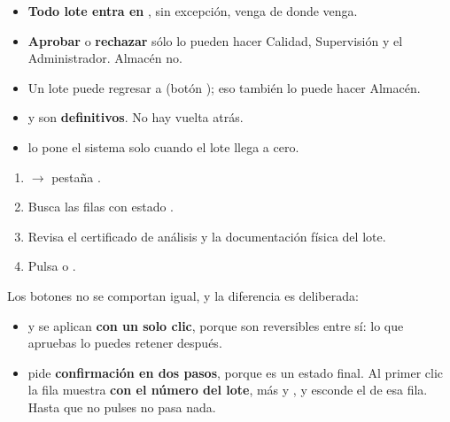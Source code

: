 \begin{itemize}
    \item \textbf{Todo lote entra en \cuarentena}, sin excepción, venga de donde venga.
    \item \textbf{Aprobar} o \textbf{rechazar} sólo lo pueden hacer Calidad, Supervisión
          y el Administrador. Almacén no.
    \item Un lote \aprobado{} puede regresar a \cuarentena{} (botón );
          eso también lo puede hacer Almacén.
    \item \rechazado{} y \agotado{} son \textbf{definitivos}. No hay vuelta atrás.
    \item \agotado{} lo pone el sistema solo cuando el lote llega a cero.
\end{itemize}


\begin{enumerate}
    \item {} $\rightarrow$ pestaña .
    \item Busca las filas con estado \cuarentena.
    \item Revisa el certificado de análisis y la documentación física del lote.
    \item Pulsa  o .
\end{enumerate}


\vspace{6pt}

Los botones no se comportan igual, y la diferencia es deliberada:

\begin{itemize}
    \item {} y  se aplican \textbf{con un solo clic}, porque
          son reversibles entre sí: lo que apruebas lo puedes retener después.
    \item {} pide \textbf{confirmación en dos pasos}, porque \rechazado{}
          es un estado final. Al primer clic la fila muestra 
          \textbf{con el número del lote}, más  y ,
          y esconde el  de esa fila. Hasta que no pulses
           no pasa nada.
\end{itemize}


